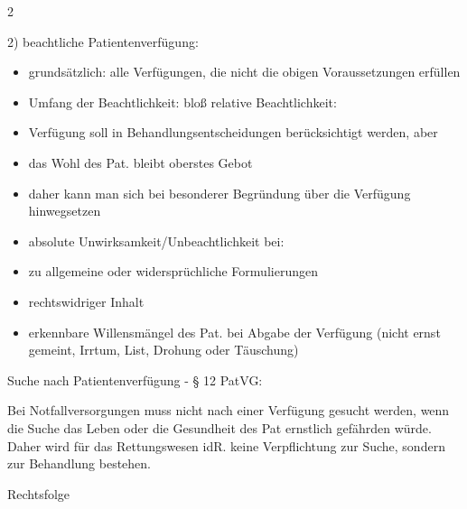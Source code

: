 \documentclass{article}
\begin{document}
\begin{multicols}{2}
\begin{itemize}
2) beachtliche Patientenverf\"ugung:

\end{itemize}
\begin{itemize}
\item grunds\"atzlich: alle Verf\"ugungen, die nicht die obigen
Voraussetzungen erf\"ullen

\item Umfang der Beachtlichkeit: blo{\ss} relative Beachtlichkeit:

\end{itemize}
\begin{itemize}
\item Verf\"ugung soll in Behandlungsentscheidungen ber\"ucksichtigt
werden, aber

\item das Wohl des Pat. bleibt oberstes Gebot 

\item daher kann man sich bei besonderer Begr\"undung \"uber die
Verf\"ugung hinwegsetzen

\end{itemize}
\begin{itemize}
\item absolute Unwirksamkeit/Unbeachtlichkeit bei:

\end{itemize}
\begin{itemize}
\item zu allgemeine oder widerspr\"uchliche Formulierungen

\item rechtswidriger Inhalt

\item erkennbare Willensm\"angel des Pat. bei Abgabe der Verf\"ugung
(nicht ernst gemeint, Irrtum, List, Drohung oder T\"auschung)

\end{itemize}
Suche nach Patientenverf\"ugung - {\S} 12 PatVG:

Bei Notfallversorgungen muss nicht nach einer Verf\"ugung gesucht
werden, wenn die Suche das Leben oder die Gesundheit des Pat ernstlich
gef\"ahrden w\"urde. Daher wird f\"ur das Rettungswesen idR. keine
Verpflichtung zur Suche, sondern zur Behandlung bestehen.

\end{multicols}
Rechtsfolge
\end{document}
